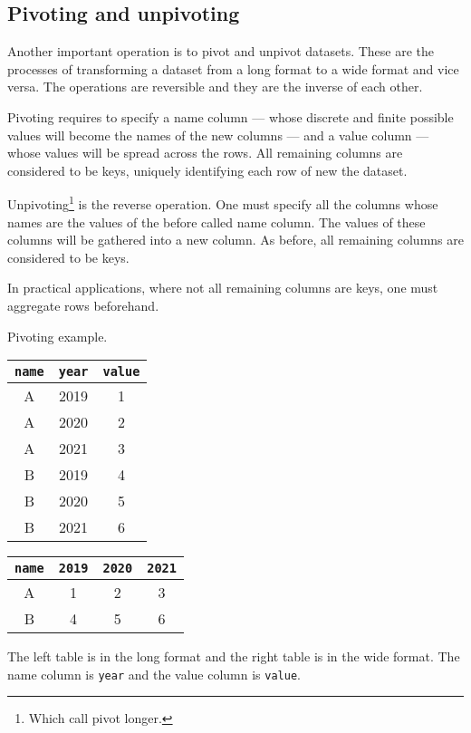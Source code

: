 \subsection{Pivoting and unpivoting}

Another important operation is to pivot and unpivot datasets.  These are the processes of
transforming a dataset from a long format to a wide format and vice versa.  The operations
are reversible and they are the inverse of each other.

Pivoting requires to specify a name column --- whose discrete and finite possible values
will become the names of the new columns --- and a value column --- whose values will be
spread across the rows.  All remaining columns are considered to be keys, uniquely
identifying each row of new the dataset.

Unpivoting\footnote{Which \citeauthor{Wickham2023} call pivot longer.} is the reverse
operation.  One must specify all the columns whose names are the values of the before
called name column.  The values of these columns will be gathered into a new column.
As before, all remaining columns are considered to be keys.

In practical applications, where not all remaining columns are keys, one must aggregate
rows beforehand.

\begin{tablebox}[label=tab:pivot]{Pivoting example.}
  \begin{minipage}{0.45\textwidth}
    \centering
    \begin{tabular}{ccc}
      \toprule
      \texttt{name} & \texttt{year} & \texttt{value} \\
      \midrule
      A & 2019 & 1 \\
      A & 2020 & 2 \\
      A & 2021 & 3 \\
      B & 2019 & 4 \\
      B & 2020 & 5 \\
      B & 2021 & 6 \\
      \bottomrule
    \end{tabular}
  \end{minipage}
  \hfill
  \begin{minipage}{0.45\textwidth}
    \centering
    \begin{tabular}{cccc}
      \toprule
      \texttt{name} & \texttt{2019} & \texttt{2020} & \texttt{2021} \\
      \midrule
      A & 1 & 2 & 3 \\
      B & 4 & 5 & 6 \\
      \bottomrule
    \end{tabular}
  \end{minipage}
  \tcblower
  The left table is in the long format and the right table is in the wide format.  The
  name column is \texttt{year} and the value column is \texttt{value}.
\end{tablebox}

